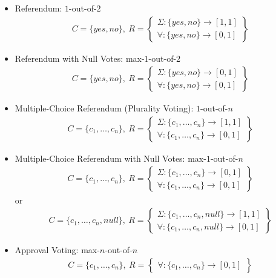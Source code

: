 \documentclass[bibtotoc,halfparskip,oneside]{scrreprt}
\begin{document}
\begin{itemize}
\item Referendum: $1$-out-of-$2$
\begin{align*}
	C=\{yes,no\},~ 
	R=\left\{\begin{aligned}\Sigma:\{yes,no\}\rightarrow[1,1] \\ \forall:\{yes,no\}\rightarrow[0,1]\end{aligned}\right\}
\end{align*}

\item Referendum with Null Votes: max-$1$-out-of-$2$
\begin{align*}
	C=\{yes,no\},~
	R=\left\{\begin{aligned}\Sigma:\{yes,no\}\rightarrow[0,1] \\ \forall:\{yes,no\}\rightarrow[0,1]\end{aligned}\right\}
\end{align*}

\item Multiple-Choice Referendum (Plurality Voting): $1$-out-of-$n$
\begin{align*}
	C=\{c_1,\ldots,c_n\},~ 
	R=\left\{\begin{aligned}\Sigma:\{c_1,\ldots,c_n\}\rightarrow[1,1] \\ \forall:\{c_1,\ldots,c_n\}\rightarrow[0,1]\end{aligned}\right\}
\end{align*}

\item Multiple-Choice Referendum with Null Votes: max-$1$-out-of-$n$
\begin{align*}
	C=\{c_1,\ldots,c_n\},~ 
	R=\left\{\begin{aligned}\Sigma:\{c_1,\ldots,c_n\}\rightarrow[0,1] \\ \forall:\{c_1,\ldots,c_n\}\rightarrow[0,1]\end{aligned}\right\}
\end{align*}
or
\begin{align*}
	C=\{c_1,\ldots,c_n,null\},~ 
	R=\left\{\begin{aligned}\Sigma:\{c_1,\ldots,c_n, null\}\rightarrow[1,1] \\ \forall:\{c_1,\ldots,c_n, null\}\rightarrow[0,1]\end{aligned}\right\}
\end{align*}

\item Approval Voting: max-$n$-out-of-$n$ 
\begin{align*}
	C=\{c_1,\ldots,c_n\},~ 
	R=\left\{\begin{aligned}\forall:\{c_1,\ldots,c_n\}\rightarrow[0,1]\end{aligned}\right\}
\end{align*}


\end{itemize}
\end{document}
